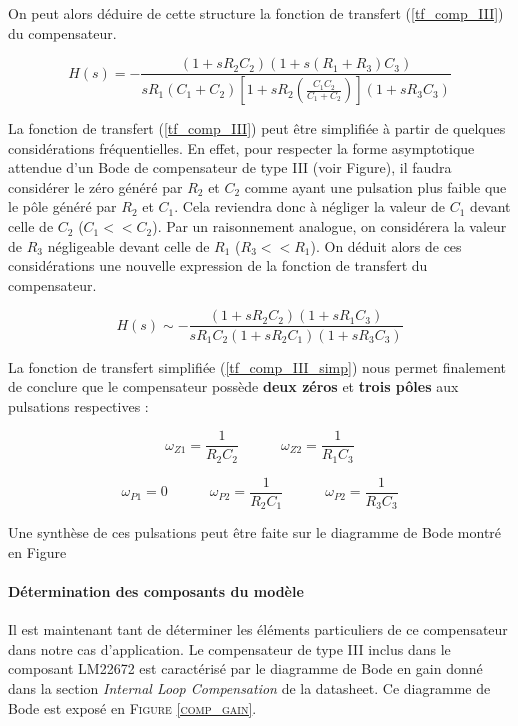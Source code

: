 \documentclass[a4paper,12pt]{book}
\begin{document}
					On peut alors déduire de cette structure la fonction de transfert (\ref{tf_comp_III}) du compensateur.
					
					\begin{equation}
						H(s) = -\frac{(1+s R_2 C_2)(1+s(R_1+R_3)C_3)}{sR_1(C_1+C_2)\left[1+sR_2\left(\frac{C_1C_2}{C_1+C_2}\right)\right](1+sR_3C_3)}
						\label{tf_comp_III}
					\end{equation}
					
					La fonction de transfert (\ref{tf_comp_III}) peut être simplifiée à partir de quelques considérations fréquentielles. En effet, pour respecter la forme asymptotique attendue d'un Bode de compensateur de type III (voir Figure), il faudra considérer le zéro généré par $R_2$ et $C_2$ comme ayant une pulsation plus faible que le pôle généré par $R_2$ et $C_1$. Cela reviendra donc à négliger la valeur de $C_1$ devant celle de $C_2$ ($C_1 << C_2$). Par un raisonnement analogue, on considérera la valeur de $R_3$ négligeable devant celle de $R_1$ ($R_3 << R_1$). On déduit alors de ces considérations une nouvelle expression de la fonction de transfert du compensateur.
					
					\begin{equation}
						H(s) \sim -\frac{(1+s R_2 C_2)(1+sR_1 C_3)}{sR_1 C_2 (1+sR_2 C_1) (1+sR_3C_3)}
						\label{tf_comp_III_simp}
					\end{equation}
					
					La fonction de transfert simplifiée (\ref{tf_comp_III_simp}) nous permet finalement de conclure que le compensateur possède \textbf{deux zéros} et \textbf{trois pôles} aux pulsations respectives :
					
					\begin{equation}
						\omega_{Z1} = \frac{1}{R_2C_2}
						\quad\quad\quad
						\omega_{Z2} = \frac{1}{R_1C_3}
					\end{equation}
					
					\begin{equation}
						\omega_{P1} = 0
						\quad\quad\quad
						\omega_{P2} = \frac{1}{R_2C_1}
						\quad\quad\quad
						\omega_{P2} = \frac{1}{R_3C_3}
					\end{equation}
					
					Une synthèse de ces pulsations peut être faite sur le diagramme de Bode montré en Figure 
					
					
					\paragraph{Détermination des composants du modèle}
					Il est maintenant tant de déterminer les éléments particuliers de ce compensateur dans notre cas d'application. Le compensateur de type III inclus dans le composant LM22672 est caractérisé par le diagramme de Bode en gain donné dans la section \textit{Internal Loop Compensation} de la datasheet. Ce diagramme de Bode est exposé en \textsc{Figure \ref{comp_gain}}.
					
\end{document}
